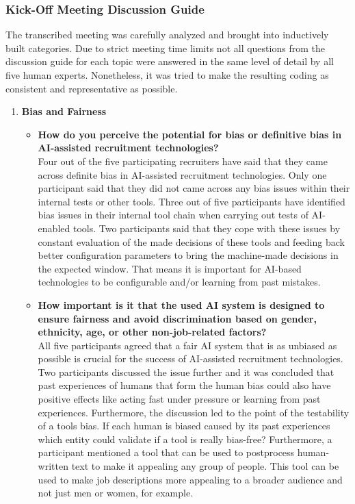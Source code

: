\documentclass[draft,final]{thesisclass} %
\begin{document}
\subsubsection{Kick-Off Meeting Discussion Guide}
The transcribed meeting was carefully analyzed and brought into inductively built categories. Due to strict meeting time limits not all questions from the discussion guide for each topic were answered in the same level of detail by all five human experts. Nonetheless, it was tried to make the resulting coding as consistent and representative as possible.
\begin{enumerate}
    \item \textbf{Bias and Fairness}
    \begin{itemize}
        \item \textbf{How do you perceive the potential for bias or definitive bias in \acs{AI}-assisted recruitment technologies?}\\
        Four out of the five participating recruiters have said that they came across definite bias in \acs{AI}-assisted recruitment technologies. Only one participant said that they did not came across any bias issues within their internal tests or other tools. Three out of five participants have identified bias issues in their internal tool chain when carrying out tests of \acs{AI}-enabled tools. Two participants said that they cope with these issues by constant evaluation of the made decisions of these tools and feeding back better configuration parameters to bring the machine-made decisions in the expected window. That means it is important for \acs{AI}-based technologies to be configurable and/or learning from past mistakes.
        \item \textbf{How important is it that the used \acs{AI} system is designed to ensure fairness and avoid discrimination based on gender, ethnicity, age, or other non-job-related factors?}\\
        All five participants agreed that a fair \acs{AI} system that is as unbiased as possible is crucial for the success of \acs{AI}-assisted recruitment technologies. Two participants discussed the issue further and it was concluded that past experiences of humans that form the human bias could also have positive effects like acting fast under pressure or learning from past experiences. Furthermore, the discussion led to the point of the testability of a tools bias. If each human is biased caused by its past experiences which entity could validate if a tool is really bias-free? Furthermore, a participant mentioned a tool that can be used to postprocess human-written text to make it appealing any group of people. This tool can be used to make job descriptions more appealing to a broader audience and not just men or women, for example.

\end{itemize}
\end{enumerate}
\end{document}
